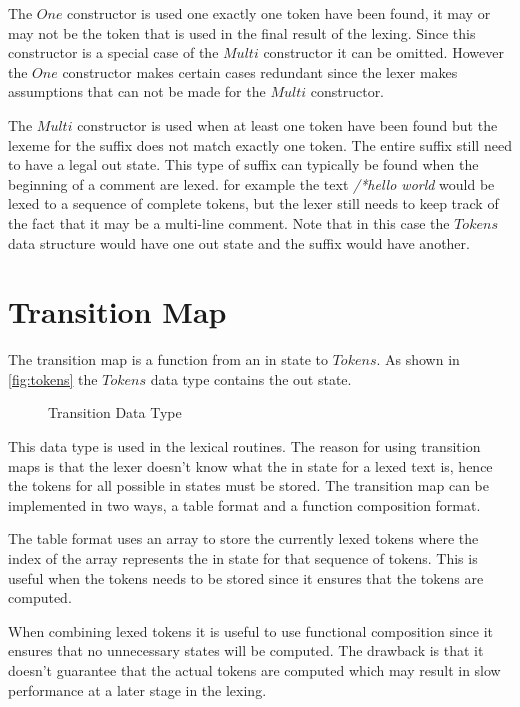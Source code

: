 The $One$ constructor is used one exactly one token have been found, it may or
may not be the token that is used in the final result of the lexing. Since this
constructor is a special case of the $Multi$ constructor it can be omitted.
However the $One$ constructor makes certain cases redundant since the lexer
makes assumptions that can not be made for the $Multi$ constructor.

The $Multi$ constructor is used when at least one token have been found but the
lexeme for the suffix does not match exactly one token. The entire suffix still
need to have a legal out state. This type of suffix can typically be found when
the beginning of a comment are lexed. for example the text
\emph{/*hello world} would be lexed to a sequence of complete tokens, but the
lexer still needs to keep track of the fact that it may be a multi-line
comment. Note that in this case the $Tokens$ data structure would have one out
state and the suffix would have another.

\section{Transition Map}
The transition map is a function from an in state to $Tokens$. As shown in
\cref{fig:tokens} the $Tokens$ data type contains the out state.

\begin{figure}[h!]
  
  \caption{Transition Data Type \label{fig:transition}}
\end{figure}

This data type is used in the lexical routines. The reason for using transition
maps is that the lexer doesn't know what the in state for a lexed text is, hence
the tokens for all possible in states must be stored. The transition map can be
implemented in two ways, a table format and a function composition format.

The table format uses an array to store the currently lexed tokens where the
index of the array represents the in state for that sequence of tokens. This is
useful when the tokens needs to be stored since it ensures that the tokens are
computed.

When combining lexed tokens it is useful to use functional composition since it
ensures that no unnecessary states will be computed. The drawback is that it
doesn't guarantee that the actual tokens are computed which may result in slow
performance at a later stage in the lexing.

